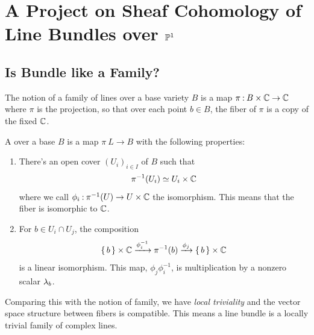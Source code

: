 \documentclass[12pt]{memoir}
\begin{document}
\chapter{A Project on Sheaf Cohomology of Line Bundles over $\mathbb{P}^1$}


\section{Is Bundle like a Family?}

The notion of a family of lines over a base variety $B$ is a map $\pi\mathbin{:} B\times\mathbb{C}\to\mathbb{C}$ where $\pi$ is the projection, so that over each point $b\in B$, the fiber of $\pi$ is a copy of the fixed $\mathbb{C}$. 

\begin{Def}
    A  over a base $B$ is a map $\pi\: L\to B$ with the following properties:
    \begin{enumerate}
        \item There's an open cover $(U_i)_{i\in I}$ of $B$ such that 
        $$\pi^{-1}(U_i)\simeq U_i\times\mathbb{C}$$
        where we call $\phi_i\mathbin{:}\pi^{-1}(U)\to U\times\mathbb{C}$ the isomorphism. This means that the fiber is isomorphic to $\mathbb{C}$.
        \item For $b\in U_i\cap U_j$, the composition
        $$\{\,b\,\}\times\mathbb{C}\xrightarrow[]{\phi_i^{-1}}\pi^{-1}(b)\xrightarrow[]{\phi_j}\{\,b\,\}\times\mathbb{C}$$
        is a linear isomorphism. This map, $\phi_j\phi_i^{-1}$, is multiplication by a nonzero scalar $\lambda_b$.
    \end{enumerate}
\end{Def}

Comparing this with the notion of family, we have \emph{local triviality} and the vector space structure between fibers is compatible. This means a line bundle is a locally trivial family of complex lines. 
\end{document}
